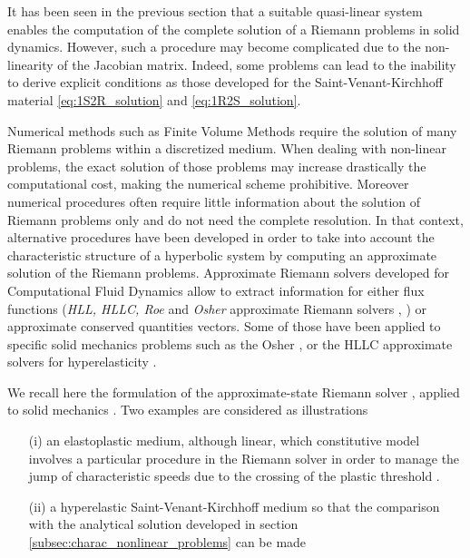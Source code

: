 It has been seen in the previous section that a suitable quasi-linear system enables the computation of the complete solution of a Riemann problems in solid dynamics. However, such a procedure may become complicated due to the non-linearity of the Jacobian matrix. Indeed, some problems can lead to the inability to derive explicit conditions as those developed for the Saint-Venant-Kirchhoff material \eqref{eq:1S2R_solution} and \eqref{eq:1R2S_solution}.

Numerical methods such as Finite Volume Methods \cite{Leveque} require the solution of many Riemann problems within a discretized medium. When dealing with non-linear problems, the exact solution of those problems may increase drastically the computational cost, making the numerical scheme prohibitive. Moreover numerical procedures often require little information about the solution of Riemann problems only and do not need the complete resolution. In that context, alternative procedures have been developed in order to take into account the characteristic structure of a hyperbolic system by computing an approximate solution of the Riemann problems. Approximate Riemann solvers developed for Computational Fluid Dynamics allow to extract information for either flux functions (\textit{HLL, HLLC, Roe} and \textit{Osher} approximate Riemann solvers \cite{Trangenstein}, \cite{Toro}) or approximate conserved quantities vectors. Some of those have been applied to specific solid mechanics problems such as the Osher \cite{LEE_FVM}, \cite{Haider_FVM} or the HLLC \cite{Ortega_HLLD} approximate solvers for hyperelasticity .

We recall here the formulation of the approximate-state Riemann solver \cite[Ch.9]{Toro}, applied to solid mechanics \cite[Ch.22]{Leveque}. Two examples are considered as illustrations
\begin{itemize}
\item[(i)] an elastoplastic medium, although linear, which constitutive model involves a particular procedure in the Riemann solver in order to manage the jump of characteristic speeds due to the crossing of the plastic threshold \cite{Fogarty}.
\item[(ii)] a hyperelastic Saint-Venant-Kirchhoff medium so that the comparison with the analytical solution developed in section \ref{subsec:charac_nonlinear_problems} can be made
\end{itemize}



